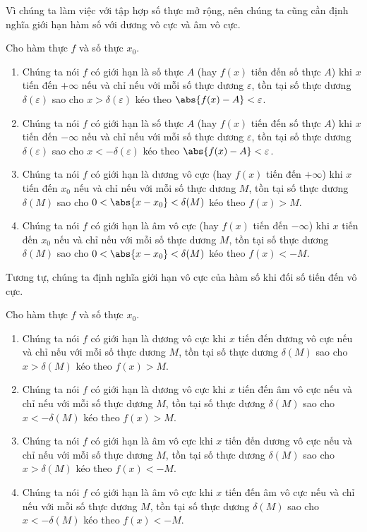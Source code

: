 Vì chúng ta làm việc với tập hợp số thực mở rộng, nên chúng ta cũng cần định nghĩa giới hạn hàm số với dương vô cực và âm vô cực.
\begin{definition}
    Cho hàm thực $f$ và số thực $x_{0}$.
    \begin{enumerate}[label={(\roman*)},itemsep=0pt]
        \item Chúng ta nói $f$ có giới hạn là số thực $A$ (hay $f(x)$ tiến đến số thực $A$) khi $x$ tiến đến $+\infty$ nếu và chỉ nếu với mỗi số thực dương $\varepsilon$, tồn tại số thực dương $\delta(\varepsilon)$ sao cho $x > \delta(\varepsilon)$ kéo theo $\abs{f(x) - A} < \varepsilon$.
        \item Chúng ta nói $f$ có giới hạn là số thực $A$ (hay $f(x)$ tiến đến số thực $A$) khi $x$ tiến đến $-\infty$ nếu và chỉ nếu với mỗi số thực dương $\varepsilon$, tồn tại số thực dương $\delta(\varepsilon)$ sao cho $x < -\delta(\varepsilon)$ kéo theo $\abs{f(x) - A} < \varepsilon$.
        \item Chúng ta nói $f$ có giới hạn là dương vô cực (hay $f(x)$ tiến đến $+\infty$) khi $x$ tiến đến $x_{0}$ nếu và chỉ nếu với mỗi số thực dương $M$, tồn tại số thực dương $\delta(M)$ sao cho $0 < \abs{x - x_{0}} < \delta(M)$ kéo theo $f(x) > M$.
        \item Chúng ta nói $f$ có giới hạn là âm vô cực (hay $f(x)$ tiến đến $-\infty$) khi $x$ tiến đến $x_{0}$ nếu và chỉ nếu với mỗi số thực dương $M$, tồn tại số thực dương $\delta(M)$ sao cho $0 < \abs{x - x_{0}} < \delta(M)$ kéo theo $f(x) < -M$.
    \end{enumerate}
\end{definition}

Tương tự, chúng ta định nghĩa giới hạn vô cực của hàm số khi đối số tiến đến vô cực.
\begin{definition}
    Cho hàm thực $f$ và số thực $x_{0}$.
    \begin{enumerate}[label={(\roman*)},itemsep=0pt]
        \item Chúng ta nói $f$ có giới hạn là dương vô cực khi $x$ tiến đến dương vô cực nếu và chỉ nếu với mỗi số thực dương $M$, tồn tại số thực dương $\delta(M)$ sao cho $x > \delta(M)$ kéo theo $f(x) > M$.
        \item Chúng ta nói $f$ có giới hạn là dương vô cực khi $x$ tiến đến âm vô cực nếu và chỉ nếu với mỗi số thực dương $M$, tồn tại số thực dương $\delta(M)$ sao cho $x < -\delta(M)$ kéo theo $f(x) > M$.
        \item Chúng ta nói $f$ có giới hạn là âm vô cực khi $x$ tiến đến dương vô cực nếu và chỉ nếu với mỗi số thực dương $M$, tồn tại số thực dương $\delta(M)$ sao cho $x > \delta(M)$ kéo theo $f(x) < -M$.
        \item Chúng ta nói $f$ có giới hạn là âm vô cực khi $x$ tiến đến âm vô cực nếu và chỉ nếu với mỗi số thực dương $M$, tồn tại số thực dương $\delta(M)$ sao cho $x < -\delta(M)$ kéo theo $f(x) < -M$.
    \end{enumerate}
\end{definition}

